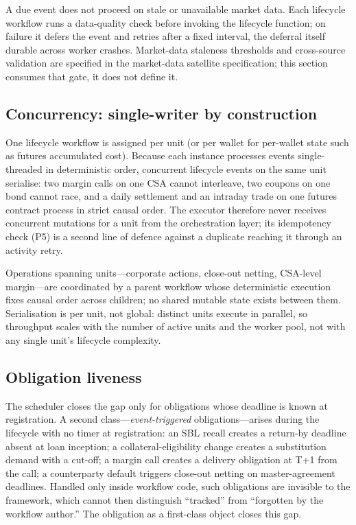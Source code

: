 A due event does not proceed on stale or unavailable market data. Each lifecycle workflow runs a data-quality check before invoking the lifecycle function; on failure it defers the event and retries after a fixed interval, the deferral itself durable across worker crashes. Market-data staleness thresholds and cross-source validation are specified in the market-data satellite specification; this section consumes that gate, it does not define it.

\subsection{Concurrency: single-writer by construction}
\label{sec:temporal-concurrency}

One lifecycle workflow is assigned per unit (or per wallet for per-wallet state such as futures accumulated cost). Because each instance processes events single-threaded in deterministic order, concurrent lifecycle events on the same unit serialise: two margin calls on one CSA cannot interleave, two coupons on one bond cannot race, and a daily settlement and an intraday trade on one futures contract process in strict causal order. The executor therefore never receives concurrent mutations for a unit from the orchestration layer; its idempotency check (P5) is a second line of defence against a duplicate reaching it through an activity retry.

Operations spanning units---corporate actions, close-out netting, CSA-level margin---are coordinated by a parent workflow whose deterministic execution fixes causal order across children; no shared mutable state exists between them. Serialisation is per unit, not global: distinct units execute in parallel, so throughput scales with the number of active units and the worker pool, not with any single unit's lifecycle complexity.

\subsection{Obligation liveness}
\label{sec:obligation-liveness}

The scheduler closes the gap only for obligations whose deadline is known at registration. A second class---\emph{event-triggered} obligations---arises during the lifecycle with no timer at registration: an SBL recall creates a return-by deadline absent at loan inception; a collateral-eligibility change creates a substitution demand with a cut-off; a margin call creates a delivery obligation at T+1 from the call; a counterparty default triggers close-out netting on master-agreement deadlines. Handled only inside workflow code, such obligations are invisible to the framework, which cannot then distinguish ``tracked'' from ``forgotten by the workflow author.'' The obligation as a first-class object closes this gap.

